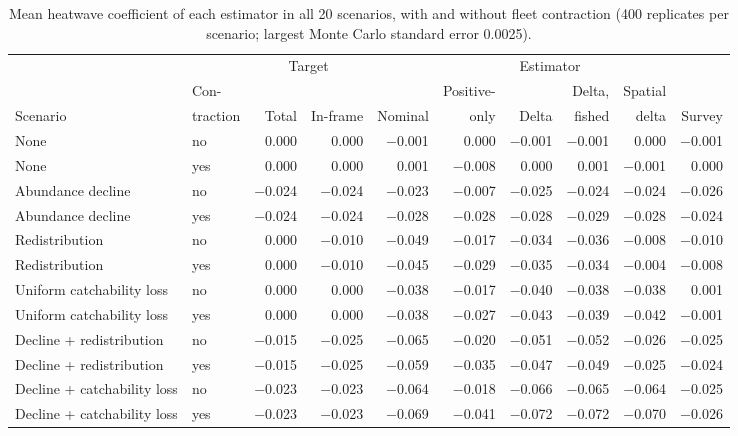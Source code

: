 \documentclass[11pt,a4paper]{article}
\begin{document}
\begin{table}[htbp]
\centering\scriptsize
\setlength{\tabcolsep}{2.5pt}
\caption{Mean heatwave coefficient of each estimator in all 20 scenarios, with and without fleet contraction (400 replicates per scenario; largest Monte Carlo standard error 0.0025).}
\label{tab:coeffull}
\begin{tabular}{@{}>{\raggedright\arraybackslash}p{2.9cm}lrrrrrrrr@{}}
\toprule
 & & \multicolumn{2}{c}{Target} & \multicolumn{6}{c}{Estimator} \\
\cmidrule(lr){3-4}\cmidrule(l){5-10}
 & Con- & & & & Positive- & & Delta, & Spatial & \\
Scenario & traction & Total & In-frame & Nominal & only & Delta & fished & delta & Survey \\
\midrule
None & no & 0.000 & 0.000 & $-$0.001 & 0.000 & $-$0.001 & $-$0.001 & 0.000 & $-$0.001 \\
None & yes & 0.000 & 0.000 & 0.001 & $-$0.008 & 0.000 & 0.001 & $-$0.001 & 0.000 \\
Abundance decline & no & $-$0.024 & $-$0.024 & $-$0.023 & $-$0.007 & $-$0.025 & $-$0.024 & $-$0.024 & $-$0.026 \\
Abundance decline & yes & $-$0.024 & $-$0.024 & $-$0.028 & $-$0.028 & $-$0.028 & $-$0.029 & $-$0.028 & $-$0.024 \\
Redistribution & no & 0.000 & $-$0.010 & $-$0.049 & $-$0.017 & $-$0.034 & $-$0.036 & $-$0.008 & $-$0.010 \\
Redistribution & yes & 0.000 & $-$0.010 & $-$0.045 & $-$0.029 & $-$0.035 & $-$0.034 & $-$0.004 & $-$0.008 \\
Uniform catchability loss & no & 0.000 & 0.000 & $-$0.038 & $-$0.017 & $-$0.040 & $-$0.038 & $-$0.038 & 0.001 \\
Uniform catchability loss & yes & 0.000 & 0.000 & $-$0.038 & $-$0.027 & $-$0.043 & $-$0.039 & $-$0.042 & $-$0.001 \\
Decline + redistribution & no & $-$0.015 & $-$0.025 & $-$0.065 & $-$0.020 & $-$0.051 & $-$0.052 & $-$0.026 & $-$0.025 \\
Decline + redistribution & yes & $-$0.015 & $-$0.025 & $-$0.059 & $-$0.035 & $-$0.047 & $-$0.049 & $-$0.025 & $-$0.024 \\
Decline + catchability loss & no & $-$0.023 & $-$0.023 & $-$0.064 & $-$0.018 & $-$0.066 & $-$0.065 & $-$0.064 & $-$0.025 \\
Decline + catchability loss & yes & $-$0.023 & $-$0.023 & $-$0.069 & $-$0.041 & $-$0.072 & $-$0.072 & $-$0.070 & $-$0.026 \\

\end{tabular}
\end{table}
\end{document}
